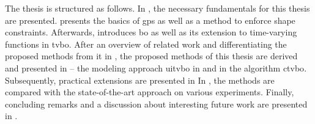 The thesis is structured as follows. In , the necessary fundamentals for this thesis are presented.  presents the basics of \glspl{gp} as well as a method to enforce shape constraints. Afterwards,  introduces \gls{bo} as well as its extension to time-varying functions in \gls{tvbo}.
After an overview of related work and differentiating the proposed methods from it in , the proposed methods of this thesis are derived and presented in  -- the modeling approach \gls{uitvbo} in  and in  the algorithm \gls{ctvbo}. Subsequently, practical extensions are presented in  In , the methods are compared with the state-of-the-art approach on various experiments. Finally, concluding remarks and a discussion about interesting future work are presented in .


